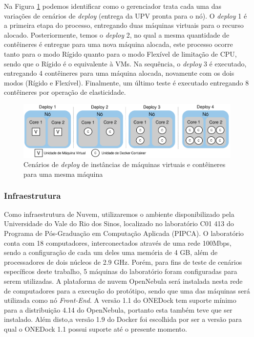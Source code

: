 \documentclass[twoside,english,brazilian]{UNISINOSartigo}
\begin{document}
Na Figura \ref{fig:deploy} podemos identificar como o gerenciador trata cada uma das variações de cenários de \textit{deploy} (entrega da UPV pronta para o nó). O \textit{deploy} 1 é a primeira etapa do processo, entregando duas máquinas virtuais para o recurso alocado. Posteriormente, temos o \textit{deploy} 2, no qual a mesma quantidade de contêineres é entregue para uma nova máquina alocada, este processo ocorre tanto para o modo Rígido quanto para o modo Flexível de limitação de CPU, sendo que o Rígido é o equivalente à VMs. Na sequência, o \textit{deploy} 3 é executado, entregando 4 contêineres para uma máquina alocada, novamente com os dois modos (Rígido e Flexível). Finalmente, um último teste é executado entregando 8 contêineres por operação de elasticidade.

\begin{figure}[ht!]
	\caption{Cenários de \textit{deploy} de instâncias de máquinas virtuais e contêineres para uma mesma máquina}
	\label{fig:deploy}
	\centering%
	\begin{minipage}{0.8\textwidth}
		\includegraphics[width=\textwidth]{images/deploy}
	\end{minipage}
\end{figure}

\subsubsection{Infraestrutura}

Como infraestrutura de Nuvem, utilizaremos o ambiente disponibilizado pela Universidade do Vale do Rio dos Sinos, localizado no laboratório C01 413 do Programa de Pós-Graduação em Computação Aplicada (PIPCA). O laboratório conta com 18 computadores, interconectados através de uma rede 100Mbps, sendo a configuração de cada um deles uma memória de 4 GB, além de processadores de dois núcleos de 2.9 GHz. Porém, para fins de teste de cenários específicos deste trabalho, 5 máquinas do laboratório foram configuradas para serem utilizadas. A plataforma de nuvem OpenNebula será instalada nesta rede de computadores para a execução do protótipo, sendo que uma das máquinas será utilizada como nó \textit{Front-End}. 
A versão 1.1 do ONEDock tem suporte mínimo para a distribuição 4.14 do OpenNebula, portanto esta também teve que ser instalado. Além disto,a versão 1.9 do Docker foi escolhida por ser a versão para qual o ONEDock 1.1 possui suporte até o presente momento. 
\end{document}
